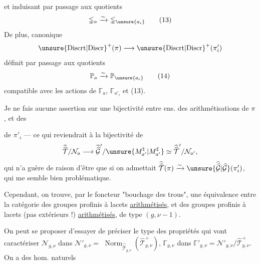 et induisant par passage aux quotients
\[
\mathbb{\Gamma}_a\xrightarrow{\sim}
\mathbb{\Gamma}_{\unsure{a_i}}
\tag{13}
\]
De plus, \uline{} canonique
\[
\unsure{\mathrm{Discrt}|\mathrm{Discr}}^{+}(\pi)\longrightarrow
\unsure{\mathrm{Discrt}|\mathrm{Discr}}^{+}(\pi'_i)
\]
définit par passage aux quotients
\[
\mathbb{P}_a\xrightarrow{\sim}\mathbb{P}_{\unsure{a_i}}
\tag{14}
\]
compatible avec les actions de $\mathbb{\Gamma}_a$,
$\mathbb{\Gamma}_{a'_i}$ et (13).

Je ne fais  aucune assertion sur
une  bijectivité entre
ens. des arithmétisations de $\pi$, et  des

 de $\pi'_i$ --- ce qui
reviendrait à la bijectivité de
\[
\widehat{\widehat{\mathcal T}}/\mathcal N_a
\longrightarrow
\widehat{\widehat{\mathcal G}}'/\unsure{M_{a'}^{\natural}|M_{a'}^{\sharp}}
\simeq \widehat{\widehat{\mathcal T}}'/\mathcal N_{a'},
\]
qui n'a guère de raison d'être que si
on admettait
$\widehat{\widehat{\mathcal T}}(\pi)\xrightarrow{\sim}\unsure{\widehat{\widehat{\mathcal G}}|\widehat{\mathcal G}}(\pi'_i)$,
qui me semble bien problématique.

Cependant, on trouve, par le foncteur
"bouchage des trous", une équivalence
entre la catégorie des 
groupes profinis à lacets  \uline{arithmétisés},
et des groupes profinis à lacets
(pas extérieurs !) \uline{arithmétisés}, de type
$(g,\nu-1)$.

On peut se proposer d'essayer de
préciser  le type des propriétés
qui vont caractériser $\mathcal N_{g,\nu}$ dans $\mathcal N'_{g,\nu}=$
$\operatorname{Norm}_{\widehat{\widehat{\mathcal T}}_{g,\nu}}
(\widehat{\mathcal T}_{g,\nu}^{+})$,
$\mathbb{\Gamma}_{g,\nu}$
dans $\mathbb{\Gamma}'_{g,\nu}=\mathcal N'_{g,\nu}/\widehat{\mathcal T}_{g,\nu}^{+}$.
On a des hom. naturels


